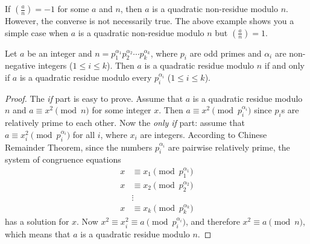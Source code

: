 \documentclass[main.tex]{subfile}
\begin{document}
	\begin{note}
		If $\left(\frac{a}{n}\right)=-1$ for some $a$ and $n$, then $a$ is a quadratic non-residue modulo $n$. However, the converse is not necessarily true. The above example shows you a simple case when $a$ is a quadratic non-residue modulo $n$ but $\left(\frac{a}{n}\right)=1$.
	\end{note}

	\begin{theorem}
		Let $a$ be an integer and $n=p_1^{\alpha_1}p_2^{\alpha_2}\cdots p_k^{\alpha_k}$, where $p_i$ are odd primes and $\alpha_i$ are non-negative integers ($1 \leq i \leq k$). Then $a$ is a quadratic residue modulo $n$ if and only if $a$ is a quadratic residue modulo every $p_i^{\alpha_i}$  ($1 \leq i \leq k$).
	\end{theorem}

	\begin{proof}
		The \textit{if} part is easy to prove. Assume that $a$ is a quadratic residue modulo $n$ and $a \equiv x^2 \pmod n$ for some integer $x$. Then $a \equiv x^2 \pmod{p_i^{\alpha_i}}$ since $p_i$s are relatively prime to each other. Now the \textit{only if} part: assume that $a \equiv x_i^2 \pmod{p_i^{\alpha_i}}$ for all $i$, where $x_i$ are integers. According to Chinese Remainder Theorem, since the numbers ${p_i^{\alpha_i}}$ are pairwise relatively prime, the system of congruence equations
		\begin{align*}
			x & \equiv x_1\pmod{p_1^{\alpha_1}}\\
			x & \equiv x_2\pmod{p_2^{\alpha_2}}\\
			& \vdots\\
			x & \equiv x_k\pmod{p_k^{\alpha_k}}
		\end{align*}
		has a solution for $x$. Now $x^2 \equiv x_i^2 \equiv a \pmod{p_i^{\alpha_i}}$, and therefore $x^2 \equiv a \pmod n$, which means that $a$ is a quadratic residue modulo $n$.
	\end{proof}
\end{document}
